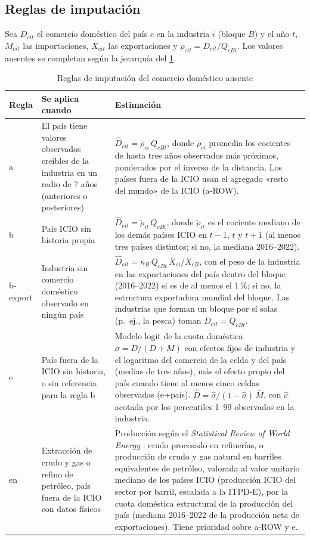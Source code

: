 \documentclass[final,1p,times,authoryear]{elsarticle}
\begin{document}
\subsection{Reglas de imputación}
Sea $D_{cit}$ el comercio doméstico del país $c$ en la industria $i$ (bloque $B$) y el año $t$, $M_{cit}$ las importaciones, $X_{cit}$ las exportaciones y $\rho_{cit} = D_{cit}/Q_{cBt}$. Los valores ausentes se completan según la jerarquía del \cref{tab:diag-reglas}.

\begin{table}[!t]
\caption{Reglas de imputación del comercio doméstico ausente}\label{tab:diag-reglas}
\centering
\footnotesize
\begin{tabularx}{\textwidth}{@{}p{1.6cm}p{4.4cm}X@{}}
\toprule
\textbf{Regla} & \textbf{Se aplica cuando} & \textbf{Estimación} \\
\midrule
a & El país tiene valores observados creíbles de la industria en un radio de 7 años (anteriores o posteriores) & $\hat D_{cit} = \bar\rho_{ci}\, Q_{cBt}$, donde $\bar\rho_{ci}$ promedia los cocientes de hasta tres años observados más próximos, ponderados por el inverso de la distancia. Los países fuera de la ICIO usan el agregado «resto del mundo» de la ICIO (a-ROW). \\
b & País ICIO sin historia propia & $\hat D_{cit} = \tilde\rho_{it}\, Q_{cBt}$, donde $\tilde\rho_{it}$ es el cociente mediano de los demás países ICIO en $t-1$, $t$ y $t+1$ (al menos tres países distintos; si no, la mediana 2016--2022). \\
b-export & Industria sin comercio doméstico observado en ningún país & $\hat D_{cit} = \kappa_B\, Q_{cBt}\, \bar X_{ci}/\bar X_{cB}$, con el peso de la industria en las exportaciones del país dentro del bloque (2016--2022) si es de al menos el 1\,\%; si no, la estructura exportadora mundial del bloque. Las industrias que forman un bloque por sí solas (p.~ej., la pesca) toman $\hat D_{cit} = Q_{cBt}$. \\
e & País fuera de la ICIO sin historia, o sin referencia para la regla b & Modelo logit de la cuota doméstica $\sigma = D/(D+M)$ con efectos fijos de industria y el logaritmo del comercio de la celda y del país (medias de tres años), más el efecto propio del país cuando tiene al menos cinco celdas observadas (e+país). $\hat D = \hat\sigma/(1-\hat\sigma)\,\bar M$, con $\hat\sigma$ acotada por los percentiles 1--99 observados en la industria. \\
en & Extracción de crudo y gas o refino de petróleo, país fuera de la ICIO con datos físicos & Producción según el \textit{Statistical Review of World Energy} \citep{EIStatReview}: crudo procesado en refinerías, o producción de crudo y gas natural en barriles equivalentes de petróleo, valorada al valor unitario mediano de los países ICIO (producción ICIO del sector por barril, escalada a la ITPD-E), por la cuota doméstica estructural de la producción del país (mediana 2016--2022 de la producción neta de exportaciones). Tiene prioridad sobre a-ROW y e. \\
\bottomrule
\end{tabularx}
\end{table}
\end{document}
